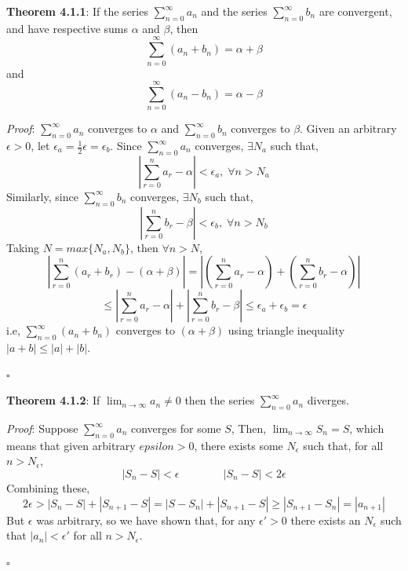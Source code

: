 \documentclass{article}
\newcommand{\separate}[1] {\vspace{#1 pt}\noindent}
\newcommand{\proof}[2]{\textit{Proof}: #2 \begin{flushright}\(\square\)\end{flushright}\label{prf:#1}}
\newcommand{\theorem}[3]{\textbf{Theorem #1}: #2 \par\separate{3}\proof{thm:#1}{#3}\label{thm:#1}}
\begin{document}
\separate{7}\theorem{4.1.1}{If the series \(\sum^\infty_{n=0}a_n\) and the series \(\sum^\infty_{n=0}b_n\) are convergent, and have respective sums \(\alpha\) and \(\beta\), then
\begin{equation}
    \sum^\infty_{n=0} (a_n + b_n) = \alpha + \beta
\end{equation}
and 
\begin{equation}
    \sum^\infty_{n=0} (a_n - b_n) = \alpha - \beta
\end{equation}}
{\(\sum^\infty_{n=0}a_n\) converges to \(\alpha\) and \(\sum^\infty_{n=0}b_n\) converges to \(\beta\). Given an arbitrary \(\epsilon > 0\), let \(\epsilon_a = \frac{1}{2}\epsilon = \epsilon_b\). Since \(\sum^\infty_{n=0}a_n\) converges, \(\exists N_a\) such that,
\begin{equation}
    \left|\sum_{r=0}^{n}a_r - \alpha\right| < \epsilon_a,\;\forall n > N_a
\end{equation}
Similarly, since \(\sum^\infty_{n=0}b_n\) converges, \(\exists N_b\) such that,
\begin{equation}
    \left|\sum_{r=0}^{n}b_r - \beta\right| < \epsilon_b,\;\forall n > N_b
\end{equation}
\newpage\noindent Taking \(N = max\{N_a,N_b\}\), then \(\forall n > N\), 
\begin{equation}
    \left|\sum_{r=0}^{n}(a_r + b_r) - (\alpha + \beta)\right| = \left|\left(\sum_{r=0}^{n}a_r - \alpha\right) + \left(\sum_{r=0}^{n}b_r - \alpha\right)\right|
\end{equation}
\begin{equation*}
    \leq \left|\sum_{r=0}^{n}a_r - \alpha\right| + \left|\sum_{r=0}^{n}b_r - \beta\right| \leq \epsilon_a + \epsilon_b = \epsilon
\end{equation*}
i.e, \(\sum^\infty_{n=0}(a_n + b_n)\) converges to \((\alpha + \beta)\) using triangle inequality \(|a+b| \leq |a| + |b|\).
}

\separate{7}\theorem{4.1.2}{If \(\lim_{n \rightarrow \infty}a_n \neq 0\) then the series \(\sum_{n=0}^{\infty}a_n\) diverges.}
{Suppose \(\sum_{n=0}^{\infty}a_n\) converges for some \(S\), Then, \(\lim_{n\rightarrow\infty}S_n = S\), which means that given arbitrary \(epsilon > 0\), there exists some \(N_\epsilon\) such that, for all \(n > N_\epsilon\),
\begin{equation}
    |S_n - S| < \epsilon \qquad\qquad |S_n - S| < 2\epsilon
\end{equation}
Combining these, 
\begin{equation}
    2\epsilon > |S_n - S| + |S_{n+1} - S| = |S - S_n| + |S_{n+1} - S| \geq |S_{n+1} - S_n| = |a_{n+1}|
\end{equation}
But \(\epsilon\) was arbitrary, so we have shown that, for any \(\epsilon' > 0\) there exists an \(N_\epsilon\) such that \(|a_n| < \epsilon'\) for all \(n > N_\epsilon\). }
\end{document}
